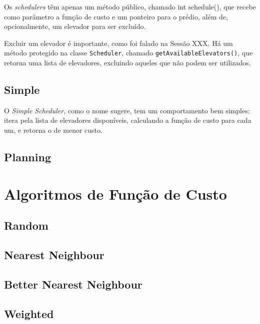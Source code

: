 Os \textit{schedulers} têm apenas um método público, chamado \textsf{int
  schedule()}, que recebe como parâmetro a função de custo e um ponteiro para o
prédio, além de, opcionalmente, um elevador para ser excluído.

Excluir um elevador é importante, como foi falado na Sessão XXX. Há um método
protegido na classe \texttt{Scheduler}, chamado
\texttt{getAvailableElevators()}, que retorna uma lista de elevadores, excluindo
aqueles que não podem ser utilizados.

\subsection{\label{model:schedulers:simple}Simple}
O \textit{Simple Scheduler}, como o nome sugere, tem um comportamento bem
simples: itera pela lista de elevadores disponíveis, calculando a função de
custo para cada um, e retorna o de menor custo.

\subsection{\label{model:schedulers:planning}Planning}
\lipsum[5]

\section{\label{model:costfunctions}Algoritmos de Função de Custo}
\lipsum[5]

\subsection{\label{model:costfunctions:random}Random}
\lipsum[5]

\subsection{\label{model:costfunctions:nn}Nearest Neighbour}
\lipsum[5]

\subsection{\label{model:costfunctions:bnn}Better Nearest Neighbour}
\lipsum[5]

\subsection{\label{model:costfunctions:weighted}Weighted}
\lipsum[5]





